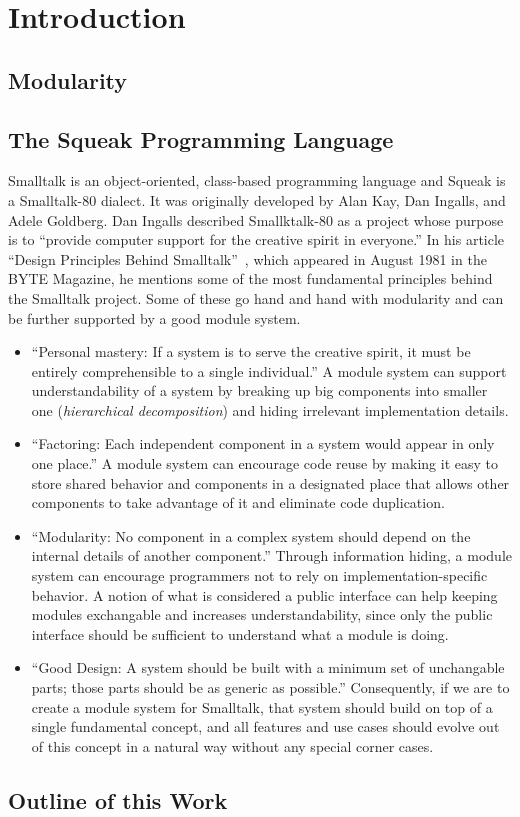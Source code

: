 \chapter{Introduction}

\section{Modularity}

\section{The Squeak Programming Language}
Smalltalk is an object-oriented, class-based programming language and Squeak is a Smalltalk-80 dialect. It was originally developed by Alan Kay, Dan Ingalls, and Adele Goldberg. Dan Ingalls described Smallktalk-80 as a project whose purpose is to ``provide computer support for the creative spirit in everyone.'' In his article ``Design Principles Behind Smalltalk''~\cite{Inga81a}, which appeared in August 1981 in the BYTE Magazine, he mentions some of the most fundamental principles behind the Smalltalk project. Some of these go hand and hand with modularity and can be further supported by a good module system.

\begin{itemize}
	\item ``Personal mastery: If a system is to serve the creative spirit, it must be entirely comprehensible to a single individual.'' A module system can support understandability of a system by breaking up big components into smaller one (\emph{hierarchical decomposition}) and hiding irrelevant implementation details.
	\item ``Factoring: Each independent component in a system would appear in only one place.'' A module system can encourage code reuse by making it easy to store shared behavior and components in a designated place that allows other components to take advantage of it and eliminate code duplication.
	\item ``Modularity: No component in a complex system should depend on the internal details of another component.'' Through information hiding, a module system can encourage programmers not to rely on implementation-specific behavior. A notion of what is considered a public interface can help keeping modules exchangable and increases understandability, since only the public interface should be sufficient to understand what a module is doing.
	\item ``Good Design: A system should be built with a minimum set of unchangable parts; those parts should be as generic as possible.'' Consequently, if we are to create a module system for Smalltalk, that system should build on top of a single fundamental concept, and all features and use cases should evolve out of this concept in a natural way without any special corner cases.
\end{itemize}


\section{Outline of this Work}
